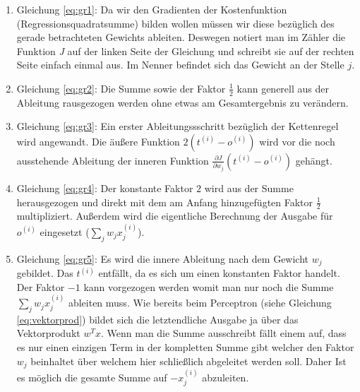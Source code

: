 \begin{enumerate}

\item Gleichung \ref{eq:gr1}: Da wir den Gradienten der Kostenfunktion (Regressionsquadratsumme) bilden wollen müssen wir diese bezüglich des gerade betrachteten Gewichts ableiten. Deswegen notiert man im Zähler die Funktion \emph{J} auf der linken Seite der Gleichung und schreibt sie auf der rechten Seite einfach einmal aus. Im Nenner befindet sich das Gewicht an der Stelle $j$. 

\item Gleichung \ref{eq:gr2}: Die Summe sowie der Faktor $\frac{1}{2}$ kann generell aus der Ableitung rausgezogen werden ohne etwas am Gesamtergebnis zu verändern. 

\item Gleichung \ref{eq:gr3}: Ein erster Ableitungssschritt bezüglich der Kettenregel wird angewandt. Die äußere Funktion $ 2 (t^{(i)} - o^{(i)}) $ wird vor die noch ausstehende Ableitung der inneren Funktion $  \frac{\partial J}{\partial w_j} (t^{(i)} - o^{(i)}) $ gehängt. 

\item Gleichung \ref{eq:gr4}: Der konstante Faktor $2$ wird aus der Summe herausgezogen und direkt mit dem am Anfang hinzugefügten Faktor $ \frac{1}{2} $ multipliziert. Außerdem wird die eigentliche Berechnung der Ausgabe für $ o^{(i)} $ eingesetzt ($\sum_j w_j x^{(i)}_{j}$). 

\item Gleichung \ref{eq:gr5}: Es wird die innere Ableitung nach dem Gewicht $w_j$ gebildet. Das $t^{(i)}$ entfällt, da es sich um einen konstanten Faktor handelt. Der Faktor $-1$ kann vorgezogen werden womit man nur noch die Summe $ \sum_j w_j x^{(i)}_{j} $ ableiten muss. Wie bereits beim Perceptron (siehe Gleichung \ref{eq:vektorprod}) bildet sich die letztendliche Ausgabe ja über das Vektorprodukt ${w^Tx}$. Wenn man die Summe ausschreibt fällt einem auf, dass es nur einen einzigen Term in der kompletten Summe gibt welcher den Faktor $w_j$ beinhaltet über welchem hier schließlich abgeleitet werden soll. Daher Ist es möglich die gesamte Summe auf $-x^{(i)}_{j}$ abzuleiten. 

\end{enumerate}

